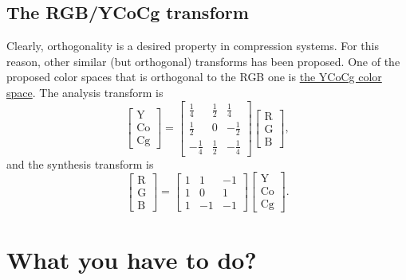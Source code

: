 \subsection{The RGB/YCoCg transform}
Clearly, orthogonality is a desired property in compression
systems. For this reason, other similar (but orthogonal)
transforms has been proposed. One of the proposed color spaces that is
orthogonal to the RGB one is \href{}{the YCoCg color space}. The analysis transform is
\begin{equation}
  \begin{bmatrix}
    \text{Y} \\
    \text{Co} \\
    \text{Cg}
  \end{bmatrix}
  =
  \begin{bmatrix}
    \frac{1}{4} &  \frac{1}{2}  &  \frac{1}{4} \\ 
    \frac{1}{2} &            0  & -\frac{1}{2} \\
    -\frac{1}{4} &  \frac{1}{2}  & -\frac{1}{4}
  \end{bmatrix}
  \begin{bmatrix}
    \text{R} \\
    \text{G} \\
    \text{B}
  \end{bmatrix},
\end{equation}
and the synthesis transform is
\begin{equation}
  \begin{bmatrix}
    \text{R} \\
    \text{G} \\
    \text{B}
  \end{bmatrix}
  =
  \begin{bmatrix}
    1  &  1  & -1 \\ 
    1  &  0  &  1 \\ 
    1  & -1  & -1
  \end{bmatrix}
  \begin{bmatrix}
    \text{Y} \\
    \text{Co} \\
    \text{Cg}
  \end{bmatrix}.
\end{equation}

\section{What you have to do?}

